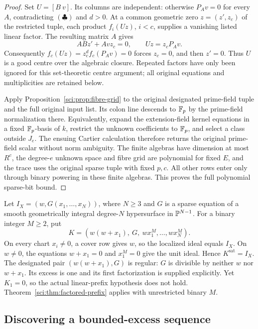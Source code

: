 \begin{proof}
Set \(U=[B\ v]\). Its columns are independent: otherwise
\(P_Av=0\) for every \(A\), contradicting \((\clubsuit)\) and
\(d>0\). At a common geometric zero \(z=(z',z_c)\) of the restricted
tuple, each product \(f_i(Uz)\), \(i<c\), supplies a vanishing
listed linear factor. The resulting matrix \(A\) gives
\[
 ABz'+Avz_c=0,
 \qquad Uz=z_cP_Av.
\]
Consequently
\(f_c(Uz)=z_c^d f_c(P_Av)=0\) forces \(z_c=0\), and then
\(z'=0\). Thus \(U\) is a good centre over the algebraic closure.
Repeated factors have only been ignored for this set-theoretic centre
argument; all original equations and multiplicities are retained below.

Apply Proposition~\ref{sci:prop:fibre-grid} to the original designated
prime-field tuple and the full original input list. Its colon line
descends to \(\mathbb F_p\) by the prime-field normalization there. Equivalently,
expand the extension-field kernel equations in a fixed \(\mathbb F_p\)-basis
of \(k\), restrict the unknown coefficients to \(\mathbb F_p\), and select a
class outside \(J_e\). The ensuing Cartier calculation therefore
returns the original prime-field scalar without norm ambiguity.
The finite algebras have dimension at most \(R^c\), the degree-\(e\)
unknown space and fibre grid are polynomial for fixed \(E\), and the
trace uses the original sparse tuple with fixed \(p,c\). All other
rows enter only through binary powering in these finite algebras.
This proves the full polynomial sparse-bit bound.
\end{proof}

\begin{example}
\label{sci:ex:factored-prefix}
Let \(I_X=(w,G(x_1,\ldots,x_N))\), where \(N\geq3\) and \(G\)
is a sparse equation of a smooth geometrically integral degree-\(N\)
hypersurface in \(\mathbb P^{N-1}\). For a binary integer \(M\geq2\), put
\[
 K=(w(w+x_1),\ G,\ wx_1^M,\ldots,wx_N^M).
\]
On every chart \(x_i\ne0\), a cover row gives \(w\), so the localized
ideal equals \(I_X\). On \(w\ne0\), the equations \(w+x_1=0\)
and \(x_1^M=0\) give the unit ideal. Hence \(K^{\mathrm{sat}}=I_X\).
The designated pair \((w(w+x_1),G)\) is regular: \(G\) is divisible
by neither \(w\) nor \(w+x_1\). Its excess is one and its first
factorization is supplied explicitly. Yet \(K_1=0\), so the actual
linear-prefix hypothesis does not hold. Theorem~\ref{sci:thm:factored-prefix}
applies with unrestricted binary \(M\).
\end{example}

\subsection{Discovering a bounded-excess sequence}

